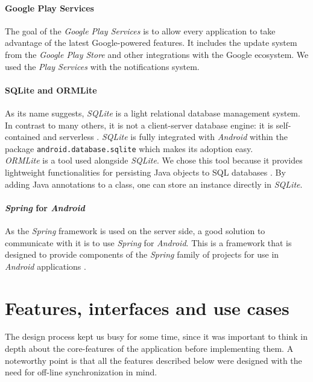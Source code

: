 \documentclass[a4paper, oneside, 11pt]{book}
\begin{document}
\subsubsection{Google Play Services}
The goal of the \textit{Google Play Services} is to allow every application to take advantage of the latest Google-powered features. It includes the update system from the \textit{Google Play Store} and other integrations with the Google ecosystem. We used the \textit{Play Services} with the notifications system.

\subsubsection{SQLite and ORMLite}
As its name suggests, \textit{SQLite} is a light relational database management system. In contrast to many others, it is not a client-server database engine: it is self-contained and serverless \cite{SQLite:online, SQLite2:online}. \textit{SQLite} is fully integrated with \textit{Android} within the package \texttt{android.database.sqlite} which makes its adoption easy.\\

\textit{ORMLite} is a tool used alongside \textit{SQLite}. We chose this tool because it provides lightweight functionalities for persisting Java objects to SQL databases \cite{OrmLite:online}. By adding Java annotations to a class, one can store an instance directly in \textit{SQLite}.

\subsubsection{\textit{Spring} for \textit{Android}}
As the \textit{Spring} framework is used on the server side, a good solution to communicate with it is to use \textit{Spring} for \textit{Android}. This is a framework that is designed to provide components of the \textit{Spring} family of projects for use in \textit{Android} applications \cite{Springandroid:online}.


\chapter{Features, interfaces and use cases}
The design process kept us busy for some time, since it was important to think in depth about the core-features of the application before implementing them. A noteworthy point is that all the features described below were designed with the need for off-line synchronization in mind. 
\end{document}
